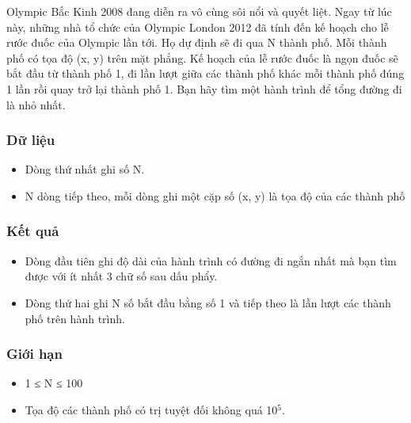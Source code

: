 

Olympic Bắc Kinh 2008 đang diễn ra vô cùng sôi nổi và quyết liệt. Ngay từ lúc này, những nhà tổ chức của Olympic London 2012 đã tính đến kế hoạch cho lễ rước đuốc của Olympic lần tới. Họ dự định sẽ đi qua N thành phố. Mỗi thành phố có tọa độ (x, y) trên mặt phẳng. Kế hoạch của lễ rước đuốc là ngọn đuốc sẽ bắt đầu từ thành phố 1, đi lần lượt giữa các thành phố khác mỗi thành phố đúng 1 lần rồi quay trở lại thành phố 1. Bạn hãy tìm một hành trình để tổng đường đi là nhỏ nhất.

\subsubsection{Dữ liệu}
\begin{itemize}
	\item Dòng thứ nhất ghi số N.
	\item N dòng tiếp theo, mỗi dòng ghi một cặp số (x, y) là tọa độ của các thành phố
\end{itemize}

\subsubsection{Kết quả}
\begin{itemize}
	\item Dòng đầu tiên ghi độ dài của hành trình có đường đi ngắn nhất mà bạn tìm được với ít nhất 3 chữ số sau dấu phẩy.
	\item Dòng thứ hai ghi N số bắt đầu bằng số 1 và tiếp theo là lần lượt các thành phố trên hành trình.
\end{itemize}

\subsubsection{Giới hạn}
\begin{itemize}
	\item 1 ≤ N ≤ 100
	\item Tọa độ các thành phố có trị tuyệt đối không quá 10$^5$.
\end{itemize}

